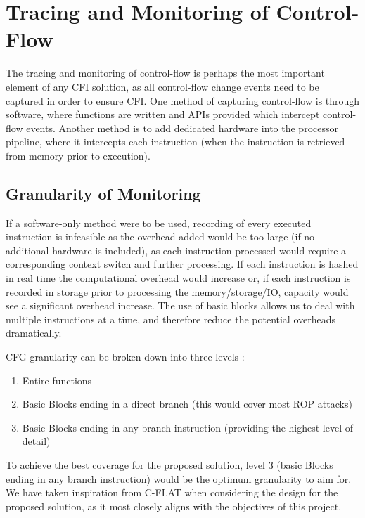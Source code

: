 \section{Tracing and Monitoring of Control-Flow}

The tracing and monitoring of control-flow is perhaps the most important element of any CFI solution, as all control-flow change events need to be captured in order to ensure CFI. One method of capturing control-flow is through software, where functions are written and APIs provided which intercept control-flow events. Another method is to add dedicated hardware into the processor pipeline, where it intercepts each instruction (when the instruction is retrieved from memory prior to execution).

\subsection{Granularity of Monitoring}\label{implementationGranularity}

If a software-only method were to be used, recording of every executed instruction is infeasible as the overhead added would be too large (if no additional hardware is included), as each instruction processed would require a corresponding context switch and further processing. If each instruction is hashed in real time the computational overhead would increase or, if each instruction is recorded in storage prior to processing the memory\slash storage\slash IO, capacity would see a significant overhead increase. The use of basic blocks allows us to deal with multiple instructions at a time, and therefore reduce the potential overheads dramatically.

CFG granularity can be broken down into three levels \cite{Abera2016}:
\begin{enumerate}
	\item{Entire functions}
	\item{Basic Blocks ending in a direct branch (this would cover most ROP attacks)}
	\item{Basic Blocks ending in any branch instruction (providing the highest level of detail)}
\end{enumerate}

To achieve the best coverage for the proposed solution, level 3 (basic Blocks ending in any branch instruction) would be the optimum granularity to aim for. We have taken inspiration from C-FLAT\cite{Abera2016} when considering the design for the proposed solution, as it most closely aligns with the objectives of this project.


